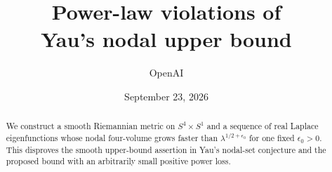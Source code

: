 \documentclass[11pt]{article}
\title{Power-law violations of\\Yau's nodal upper bound}
\author{OpenAI}
\date{September 23, 2026}
\theoremstyle{definition}
\theoremstyle{remark}
\numberwithin{equation}{section}
\begin{document}
\maketitle
\begin{abstract}
We construct a smooth Riemannian metric on $S^4\times S^1$ and a sequence
of real Laplace eigenfunctions whose nodal four-volume grows faster than
$\lambda^{1/2+\epsilon_0}$ for one fixed $\epsilon_0>0$.
This disproves the smooth upper-bound assertion in Yau's nodal-set
conjecture and the proposed bound with an arbitrarily small positive
power loss.
\end{abstract}







\end{document}
